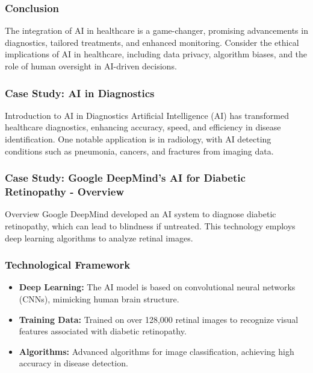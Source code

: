 \documentclass[aspectratio=169]{beamer}
\begin{document}
\begin{frame}[fragile]
    \frametitle{Conclusion}
    The integration of AI in healthcare is a game-changer, promising advancements in diagnostics, tailored treatments, and enhanced monitoring. Consider the ethical implications of AI in healthcare, including data privacy, algorithm biases, and the role of human oversight in AI-driven decisions.
\end{frame}

\begin{frame}[fragile]
    \frametitle{Case Study: AI in Diagnostics}
    \begin{block}{Introduction to AI in Diagnostics}
        Artificial Intelligence (AI) has transformed healthcare diagnostics, enhancing accuracy, speed, and efficiency in disease identification.
        One notable application is in radiology, with AI detecting conditions such as pneumonia, cancers, and fractures from imaging data.
    \end{block}
\end{frame}

\begin{frame}[fragile]
    \frametitle{Case Study: Google DeepMind's AI for Diabetic Retinopathy - Overview}
    \begin{block}{Overview}
        Google DeepMind developed an AI system to diagnose diabetic retinopathy, which can lead to blindness if untreated.
        This technology employs deep learning algorithms to analyze retinal images.
    \end{block}
\end{frame}

\begin{frame}[fragile]
    \frametitle{Technological Framework}
    \begin{itemize}
        \item \textbf{Deep Learning:} The AI model is based on convolutional neural networks (CNNs), mimicking human brain structure.
        \item \textbf{Training Data:} Trained on over 128,000 retinal images to recognize visual features associated with diabetic retinopathy.
        \item \textbf{Algorithms:} Advanced algorithms for image classification, achieving high accuracy in disease detection.
    \end{itemize}
\end{frame}
\end{document}
